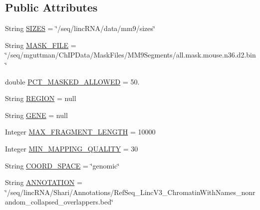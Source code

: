 \subsection*{Public Attributes}
\begin{DoxyCompactItemize}
\item 
String \hyperlink{classbroad_1_1pda_1_1seq_1_1rap_1_1_genome_command_line_program_a977f4bba37c07644bd7fe0f02415f4b9}{S\+I\+Z\+E\+S} = \char`\"{}/seq/linc\+R\+N\+A/data/mm9/sizes\char`\"{}
\item 
String \hyperlink{classbroad_1_1pda_1_1seq_1_1rap_1_1_genome_command_line_program_a95101755950aa34b2ce5556ce6711c6d}{M\+A\+S\+K\+\_\+\+F\+I\+L\+E} = \char`\"{}/seq/mguttman/Ch\+I\+P\+Data/Mask\+Files/M\+M9\+Segments/all.\+mask.\+mouse.\+n36.\+d2.\+bin\char`\"{}
\item 
double \hyperlink{classbroad_1_1pda_1_1seq_1_1rap_1_1_genome_command_line_program_acf7c9aca8c01c21ebdbee5a628add301}{P\+C\+T\+\_\+\+M\+A\+S\+K\+E\+D\+\_\+\+A\+L\+L\+O\+W\+E\+D} = 50.
\item 
String \hyperlink{classbroad_1_1pda_1_1seq_1_1rap_1_1_genome_command_line_program_a9fcda996909696710993ff1d1946e41d}{R\+E\+G\+I\+O\+N} = null
\item 
String \hyperlink{classbroad_1_1pda_1_1seq_1_1rap_1_1_genome_command_line_program_a992519fafb24df6e37ef1cf39f9f2176}{G\+E\+N\+E} = null
\item 
Integer \hyperlink{classbroad_1_1pda_1_1seq_1_1rap_1_1_genome_command_line_program_aed9dde3834b533c98c48edbcc2d2dde8}{M\+A\+X\+\_\+\+F\+R\+A\+G\+M\+E\+N\+T\+\_\+\+L\+E\+N\+G\+T\+H} = 10000
\item 
Integer \hyperlink{classbroad_1_1pda_1_1seq_1_1rap_1_1_genome_command_line_program_a153b79c2d1dc1c7136e950ab6ade3581}{M\+I\+N\+\_\+\+M\+A\+P\+P\+I\+N\+G\+\_\+\+Q\+U\+A\+L\+I\+T\+Y} = 30
\item 
String \hyperlink{classbroad_1_1pda_1_1seq_1_1rap_1_1_genome_command_line_program_a9b8d006a5a2595175626e6ca35697a9f}{C\+O\+O\+R\+D\+\_\+\+S\+P\+A\+C\+E} = \char`\"{}genomic\char`\"{}
\item 
String \hyperlink{classbroad_1_1pda_1_1seq_1_1rap_1_1_genome_command_line_program_a25bf847bc0ad690847126bd3b55e9f71}{A\+N\+N\+O\+T\+A\+T\+I\+O\+N} = \char`\"{}/seq/linc\+R\+N\+A/Shari/Annotations/Ref\+Seq\+\_\+\+Linc\+V3\+\_\+\+Chromatin\+With\+Names\+\_\+nonrandom\+\_\+collapsed\+\_\+overlappers.\+bed\char`\"{}
\end{DoxyCompactItemize}
